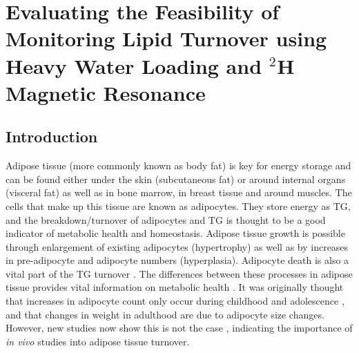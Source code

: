 \chapter{Evaluating the Feasibility of Monitoring Lipid Turnover using Heavy Water Loading and \texorpdfstring{$^2$H}{2H} Magnetic Resonance}
\label{Chap:Lipid}

\section{Introduction}

Adipose tissue (more commonly known as body fat) is key for energy storage and can be found either under the skin (subcutaneous fat) or around internal organs (visceral fat) as well as in bone marrow, in breast tissue and around muscles. The cells that make up this tissue are known as adipocytes. They store energy as \ac{TG}, and the breakdown/turnover of adipocytes and \ac{TG} is thought to be a good indicator of metabolic health and homeostasis. Adipose tissue growth is possible through enlargement of existing adipocytes (hypertrophy) as well as by increases in pre-adipocyte and adipocyte numbers (hyperplasia). Adipocyte death is also a vital part of the \ac{TG} turnover \cite{White2019DynamicsDisease}. The differences between these processes in adipose tissue provides vital information on metabolic health \cite{Carnethon2002Serum19871998}. It was originally thought that increases in adipocyte count only occur during childhood and adolescence \cite{Salans1973StudiesPatients}, and that changes in weight in adulthood are due to adipocyte size changes. However, new studies now show this is not the case \cite{White2016DifferencesWomen}, indicating the importance of \textit{in vivo} studies into adipose tissue turnover.

